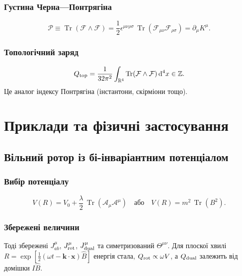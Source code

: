 \documentclass[11pt,a4paper]{article}
\numberwithin{equation}{section}
\theoremstyle{plain}
\theoremstyle{definition}
\theoremstyle{remark}
\DeclareMathOperator{\Tr}{Tr}
\newcommand{\dd}{\mathrm{d}}
\begin{document}
\subsubsection{Густина Черна—Понтрягіна}

\begin{equation}
\mathcal{P} \equiv \Tr(\mathcal{F}\wedge\mathcal{F}) = \frac{1}{2}\epsilon^{\mu\nu\rho\sigma}\,\Tr(\mathcal{F}_{\mu\nu}\mathcal{F}_{\rho\sigma})=\partial_\mu K^\mu.
\label{eq:chern-pontryagin}
\end{equation}

\subsubsection{Топологічний заряд}

\begin{equation}
Q_{\rm top} = \frac{1}{32\pi^2}\int_{\mathbb{R}^4} \Tr(\mathcal{F}\wedge\mathcal{F})\, \dd^4x \in \mathbb{Z}.
\label{eq:Q-top}
\end{equation}
Це аналог індексу Понтрягіна (інстантони, скірміони тощо).

\section{Приклади та фізичні застосування}
\label{sec:examples}

\subsection{Вільний ротор із бі-інваріантним потенціалом}

\subsubsection{Вибір потенціалу}

\begin{equation}
V(R) = V_0 + \frac{\lambda}{2}\,\Tr(\mathcal{A}_\mu\mathcal{A}^\mu) \quad \text{або} \quad V(R) = m^2\,\Tr(B^2).
\end{equation}

\subsubsection{Збережені величини}

Тоді збережені $J^\mu_{ab}$, $J^\mu_{\rm rot}$, $J^\mu_{\rm dual}$ та симетризований $\Theta^{\mu\nu}$. Для плоскої хвилі $R=\exp[\tfrac{1}{2}(\omega t-\mathbf{k}\cdot\mathbf{x})\hat{B}]$ енергія стала, $Q_{\rm rot}\propto \omega V$, а $Q_{\rm dual}$ залежить від домішки $I\hat{B}$.
\end{document}
